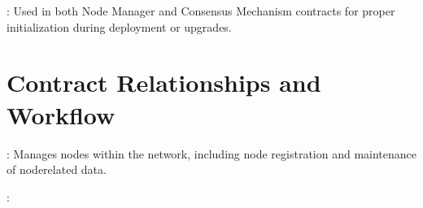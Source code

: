 \documentclass[letterpaper,10pt,english]{sphinxmanual}
\begin{document}
\sphinxAtStartPar
{}:
Used in both Node Manager and Consensus Mechanism contracts for proper initialization during deployment or upgrades.


\section{Contract Relationships and Workflow}
\label{\detokenize{docs_upgradable_contract:contract-relationships-and-workflow}}
\sphinxAtStartPar
{}

\sphinxAtStartPar
{}:
Manages nodes within the network, including node registration and maintenance of node\sphinxhyphen{}related data.

\sphinxAtStartPar
{}:
\end{document}
